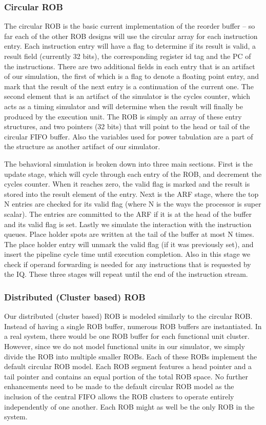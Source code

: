 \subsubsection{Circular ROB}
\label{sec:circ}
The circular ROB is the basic current implementation of the reorder buffer -- so far each of the other ROB designs will use the 
circular array for each instruction entry.  Each instruction entry will have a flag to determine if its result is valid, a 
result field (currently 32 bits), the corresponding register id tag and the PC of the instructions.  There are two additional
fields in each entry that is an artifact of our simulation, the first of which is a flag to denote a floating point entry, and 
mark that the result of the next entry is a continuation of the current one.  The second element that is an artifact of the
simulator is the cycles counter, which acts as a timing simulator and will determine when the result will finally be produced
by the execution unit.  The ROB is simply an array of these entry structures, and two pointers (32 bits) that will point
to the head or tail of the circular FIFO buffer.  Also the variables used for power tabulation are a part of the structure as 
another artifact of our simulator.

The behavioral simulation is broken down into three main sections.  First is the update stage, which will cycle 
through each entry of the ROB, and decrement the cycles counter.  When it reaches zero, the valid flag is marked and the
result is stored into the result element of the entry.  Next is the ARF stage, where the top N entries are checked
for its valid flag (where N is the ways the processor is super scalar).  The entries are committed to the ARF if it is at 
the head of the buffer and its valid flag is set.
Lastly we simulate the interaction with the instruction queues.  Place holder spots are written at the tail of the buffer
at most N times. The place holder entry will unmark the valid flag (if it was previously set), and insert the pipeline cycle
time until execution completion. Also in this stage we check if operand forwarding is needed for any instructions that is 
requested by the IQ.  These three stages will repeat until the end of the instruction stream.

\subsubsection{Distributed (Cluster based) ROB}
Our distributed (cluster based) ROB is modeled similarly to the circular ROB.  Instead of having a single ROB buffer, numerous ROB buffers are instantiated.  In a real system, there would be one ROB buffer for each functional unit cluster.  However, since we do not model functional units in our simulator, we simply divide the ROB into multiple smaller ROBs.  Each of these ROBs implement the default circular ROB model.  Each ROB segment features a head pointer and a tail pointer and contains an equal portion of the total ROB space.  No further enhancements need to be made to the default circular ROB model as the inclusion of the central FIFO allows the ROB clusters to operate entirely independently of one another.  Each ROB might as well be the only ROB in the system.


